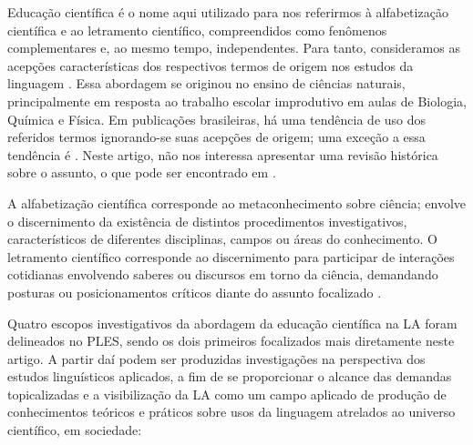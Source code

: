 Educação científica é o nome aqui utilizado para nos
referirmos à alfabetização científica e ao letramento científico,
compreendidos como fenômenos complementares e, ao mesmo tempo,
independentes. Para tanto, consideramos as acepções características dos
respectivos termos de origem nos estudos da linguagem \cite{silva_construcao_2019,soares_alfabetizacao_2003}. Essa abordagem se originou no ensino de ciências
naturais, principalmente em resposta ao trabalho escolar improdutivo em
aulas de Biologia, Química e Física. Em publicações brasileiras, há uma
tendência de uso dos referidos termos ignorando-se suas acepções de
origem; uma exceção a essa tendência é \textcite{santos_educacao_2007}. Neste artigo, não
nos interessa apresentar uma revisão histórica sobre o assunto, o que
pode ser encontrado em \textcite{silva_letramento_2016,silva_construcao_2019,silva_educacao_2020a,silva_construcao_2021}.


A alfabetização científica corresponde ao metaconhecimento sobre
ciência; envolve o discernimento da existência de distintos
procedimentos investigativos, característicos de diferentes disciplinas,
campos ou áreas do conhecimento. O letramento científico corresponde ao
discernimento para participar de interações cotidianas envolvendo
saberes ou discursos em torno da ciência, demandando posturas ou
posicionamentos críticos diante do assunto focalizado \cite{silva_letramento_2016,silva_educacao_2020a,silva_educacao_2023}.

Quatro escopos investigativos da abordagem da educação científica na LA
foram delineados no PLES, sendo os dois primeiros focalizados mais
diretamente neste artigo. A partir daí podem ser produzidas
investigações na perspectiva dos estudos linguísticos aplicados, a fim
de se proporcionar o alcance das demandas topicalizadas e a
visibilização da LA como um campo aplicado de produção de conhecimentos
teóricos e práticos sobre usos da linguagem atrelados ao universo
científico, em sociedade:

